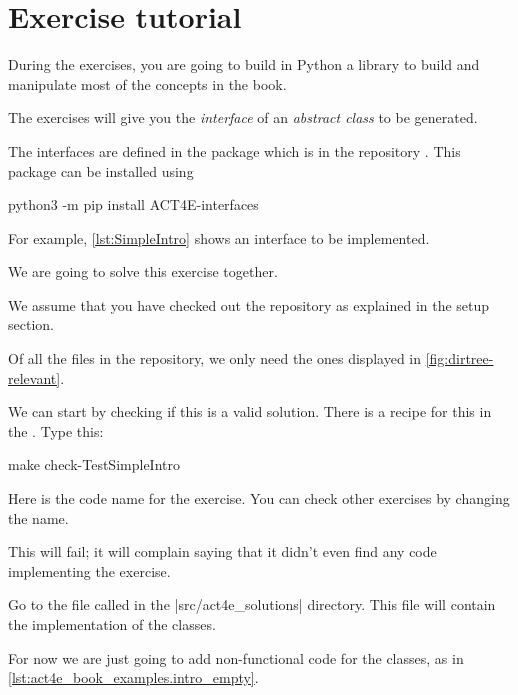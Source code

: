 
\section{Exercise tutorial}
\label{sec:exercise-tutorial}

During the exercises, you are going to build in Python a library to build and manipulate most of the concepts in the book.

The exercises will give you the \emph{interface} of an \emph{abstract class} to be generated.

The interfaces are defined in the package  which is in the repository .
This package can be installed using

\begin{console}
    python3 -m pip install ACT4E-interfaces
\end{console}

For example, \cref{lst:SimpleIntro} shows an interface  to be implemented.


We are going to solve this exercise together.

We assume that you have checked out the repository as explained in the setup section.

Of all the files in the repository, we only need the ones displayed in \cref{fig:dirtree-relevant}.

We can start by checking if this is a valid solution.
There is a recipe for this in the .
Type this:

\begin{console}
    make check-TestSimpleIntro
\end{console}

Here  is the code name for the exercise.
You can check other exercises by changing the name.

This will fail; it will complain saying that it didn't even find any code implementing the exercise.

Go to the file called  in the \files|src/act4e_solutions| directory.
This file will contain the implementation of the classes.

For now we are just going to add non-functional code for the classes, as in \cref{lst:act4e_book_examples.intro_empty}.

\begin{longcode}
    \caption{}

    \label{lst:act4e_book_examples.intro_empty}
\end{longcode}


